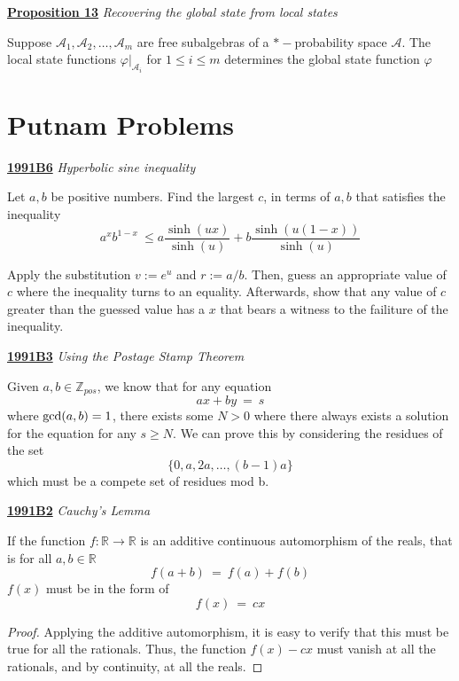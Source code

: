 \documentclass{article}
\newcommand{\new}[2]{
    \vspace{2mm}
    \noindent
    \textbf{
    \underline{#1}}
    \textit{{#2}}
    \
    \newline
}
\newcommand{\RR}{\mathbb{R}}
\begin{document}
\vspace{3mm}
\new{Proposition 13}{Recovering the global state from local states}
Suppose $\mathcal A_1, \mathcal A_2, \dots, \mathcal A_m$ are 
free subalgebras of a $*-$probability space $\mathcal A$. The local 
state functions $\varphi|_{\mathcal A_i}$ for $1 \leq i \leq m$ determines 
the global state function $\varphi$

\section{Putnam Problems}
\new{1991B6}{Hyperbolic sine inequality}
Let $a, b$ be positive numbers. Find the largest $c$, in terms of $a, b$ that 
satisfies the inequality
\begin{equation}
    a^x b^{1-x} \ \leq a \frac {
        \sinh(ux)
    } {\sinh(u)}
    + b \frac{
        \sinh(u (1-x))
    }{\sinh(u)}
\end{equation}

Apply the substitution $v:=e^u$ and $r:= a/b$. Then, guess an appropriate 
value of $c$ where the inequality turns to an equality. Afterwards, show that 
any value of $c$ greater than the guessed value has a $x$ that bears 
a witness to the failiture of the inequality. 

\new{1991B3}{Using the Postage Stamp Theorem}
Given $a, b \in \mathbb Z_{pos}$, we know that for any equation 
\begin{equation}
    ax + by \ = \ s
\end{equation}
where $\textnormal{gcd}(a, b) = 1$, there exists some $N > 0$ where 
there always exists a solution for the equation for any $s \geq N$. 
We can prove this by considering the residues of the set 
\begin{equation}
    \{0, a, 2a, \dots, (b-1) a\}
\end{equation}
which must be a compete set of residues mod b. 

\new{1991B2} {Cauchy's Lemma}
If the function $f:\RR \rightarrow \RR$ is an additive continuous automorphism of 
the reals, that is for all $a, b \in \RR$ 
\begin{equation}
    f(a + b) \ =\ f(a) + f(b)
\end{equation}
$f(x)$ must be in the form of 
\begin{equation}
    f(x) \ = \ cx
\end{equation}
\begin{proof}
Applying the additive automorphism, it is easy to verify that this must be 
true for all the rationals. Thus, the function $f(x) - cx$ must vanish 
at all the rationals, and by continuity, at all the reals. 
\end{proof}
\end{document}
